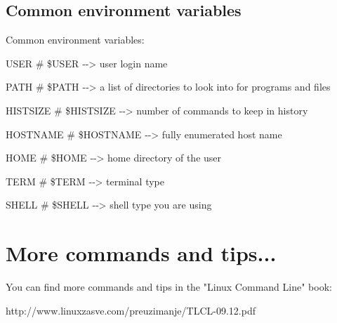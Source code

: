\documentclass{beamer}[10pt, usepdftitle=false, handout]
\begin{document}
\subsection{Common environment variables}			
\begin{frame}

Common environment variables:
\vspace*{1em}

USER \# \$USER ‐‐> user login name

PATH \# \$PATH ‐‐> a list of directories to look into for programs and files

HISTSIZE \# \$HISTSIZE ‐‐> number of commands to keep in history

HOSTNAME \# \$HOSTNAME ‐‐> fully enumerated host name

HOME \# \$HOME ‐‐> home directory of the user

TERM \# \$TERM ‐‐> terminal type

SHELL \# \$SHELL ‐‐> shell type you are using

\end{frame}			
			
\section{More commands and tips...}
			
\begin{frame}

You can find more commands and tips in the "Linux Command Line" book: 
\vspace*{1em}

http://www.linuxzasve.com/preuzimanje/TLCL-09.12.pdf

\end{frame}
			
			
\end{document}
